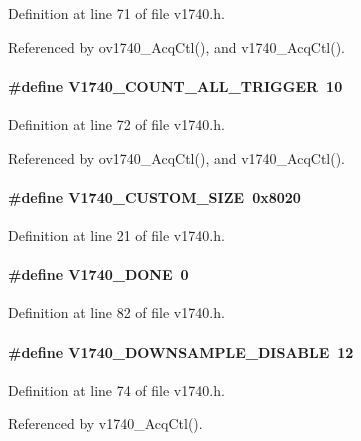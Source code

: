 Definition at line 71 of file v1740.h.

Referenced by ov1740\_\-AcqCtl(), and v1740\_\-AcqCtl().
\paragraph[{V1740\_\-COUNT\_\-ALL\_\-TRIGGER}]{\setlength{\rightskip}{0pt plus 5cm}\#define V1740\_\-COUNT\_\-ALL\_\-TRIGGER~10}\hfill\label{v1740_8h_ac285d1f33a7cf16e7b0a3faea967bc1b}


Definition at line 72 of file v1740.h.

Referenced by ov1740\_\-AcqCtl(), and v1740\_\-AcqCtl().
\paragraph[{V1740\_\-CUSTOM\_\-SIZE}]{\setlength{\rightskip}{0pt plus 5cm}\#define V1740\_\-CUSTOM\_\-SIZE~0x8020}\hfill\label{v1740_8h_a8cfe88c367bd0543f38afa7cddbcf781}


Definition at line 21 of file v1740.h.
\paragraph[{V1740\_\-DONE}]{\setlength{\rightskip}{0pt plus 5cm}\#define V1740\_\-DONE~0}\hfill\label{v1740_8h_a3f3717b88cf22eefb79d2eae94113733}


Definition at line 82 of file v1740.h.
\paragraph[{V1740\_\-DOWNSAMPLE\_\-DISABLE}]{\setlength{\rightskip}{0pt plus 5cm}\#define V1740\_\-DOWNSAMPLE\_\-DISABLE~12}\hfill\label{v1740_8h_a2ec3d0f77f80f3cf0e60cd3fd546542e}


Definition at line 74 of file v1740.h.

Referenced by v1740\_\-AcqCtl().
